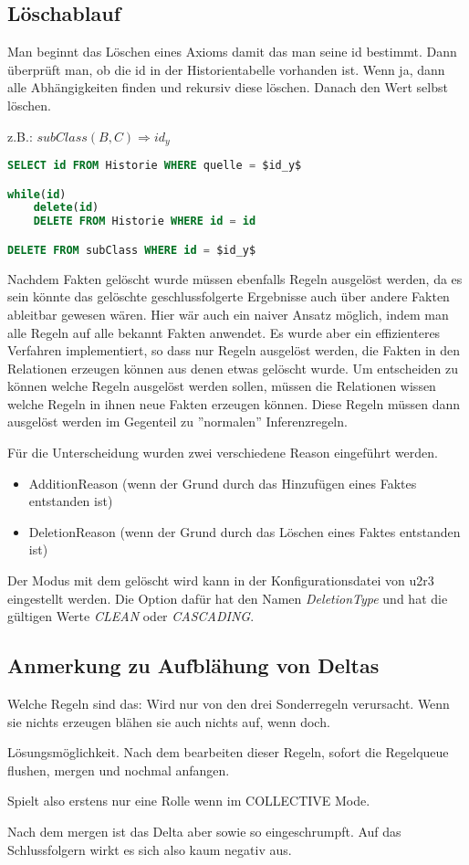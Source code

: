 \subsection{Löschablauf}
Man beginnt das Löschen eines Axioms damit das man seine id bestimmt. Dann überprüft man, ob die id in der Historientabelle vorhanden ist. Wenn ja, dann alle Abhängigkeiten finden und rekursiv diese löschen. Danach den Wert selbst löschen. 

z.B.: $subClass(B,C) \Rightarrow id_y$
\begin{lstlisting}[language=SQL]
SELECT id FROM Historie WHERE quelle = $id_y$

while(id)
	delete(id)
	DELETE FROM Historie WHERE id = id

DELETE FROM subClass WHERE id = $id_y$
\end{lstlisting}


Nachdem Fakten gelöscht wurde müssen ebenfalls Regeln ausgelöst werden, da es sein könnte das gelöschte geschlussfolgerte Ergebnisse auch über andere Fakten ableitbar gewesen wären. 
Hier wär auch ein naiver Ansatz möglich, indem man alle Regeln auf alle bekannt Fakten anwendet. Es wurde aber ein effizienteres Verfahren implementiert, so dass nur Regeln ausgelöst werden, die Fakten in den Relationen erzeugen können aus denen etwas gelöscht wurde.
Um entscheiden zu können welche Regeln ausgelöst werden sollen, müssen die Relationen wissen welche Regeln in ihnen neue Fakten erzeugen können. Diese Regeln müssen dann ausgelöst werden im Gegenteil zu ''normalen'' Inferenzregeln.

Für die Unterscheidung wurden zwei verschiedene Reason eingeführt werden.
\begin{itemize}
  \item AdditionReason (wenn der Grund durch das Hinzufügen eines Faktes entstanden ist)
  \item DeletionReason (wenn der Grund durch das Löschen eines Faktes entstanden ist)
\end{itemize}

Der Modus mit dem gelöscht wird kann in der Konfigurationsdatei von u2r3 eingestellt werden. Die Option dafür hat den Namen \emph{DeletionType} und hat die gültigen Werte \emph{CLEAN} oder \emph{CASCADING}.

\subsection{Anmerkung zu Aufblähung von Deltas}
\label{abschnitt-aufblaehung}
Welche Regeln sind das:
Wird nur von den drei Sonderregeln verursacht. Wenn sie nichts erzeugen blähen sie auch nichts auf, wenn doch.

Lösungsmöglichkeit. Nach dem bearbeiten dieser Regeln, sofort die Regelqueue flushen, mergen und nochmal anfangen.

Spielt also erstens nur eine Rolle wenn im COLLECTIVE Mode.

Nach dem mergen ist das Delta aber sowie so eingeschrumpft. Auf das Schlussfolgern wirkt es sich also kaum negativ aus.